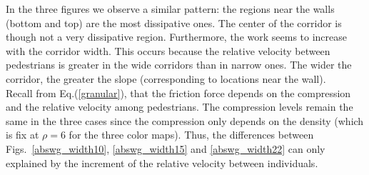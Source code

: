 \documentclass[preprint,12pt]{elsarticle}
\begin{document}
In the three figures we observe a similar pattern: the regions near the walls (bottom and top) are the most dissipative ones. The center of the corridor is though not a very dissipative region. Furthermore, the work seems to increase with the corridor width. This occurs because the relative velocity between pedestrians is greater in the wide corridors than in narrow ones. The wider the corridor, the greater the slope (corresponding to locations near the wall).\\

Recall from Eq.(\ref{granular}), that the friction force depends on the compression and the relative velocity among pedestrians. The compression levels remain the same in the three cases since the compression only depends on the density (which is fix at $\rho=6$ for the three color maps). Thus, the differences between Figs.~\ref{abswg_width10}, \ref{abswg_width15} and \ref{abswg_width22} can only explained by the increment of the relative velocity between individuals. \\
\end{document}
